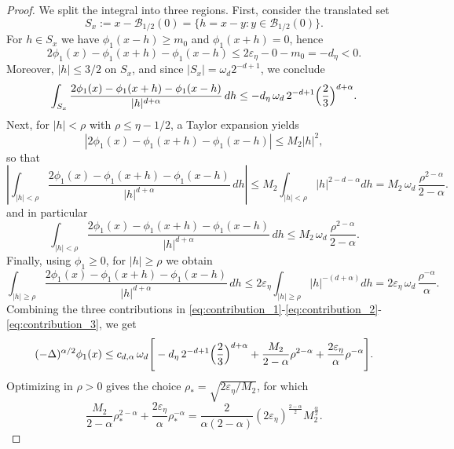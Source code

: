 \documentclass[10pt,a4paper]{amsart}
\newcommand{\abs}[1]{\left|#1\right|}
\begin{document}
\begin{proof}
	We split the integral into three regions. First, consider the translated set 
	\[ 
	S_x := x - \mathcal{B}_{1/2}(0) = \{ h = x-y : y\in \mathcal{B}_{1/2}(0)\}.
	\]   For $h\in S_x$ we have $\phi_1(x-h)\ge m_0$ and $\phi_1(x+h)=0$, hence
	\[
	2\phi_1(x)-\phi_1(x+h)-\phi_1(x-h) \le 2 \varepsilon_\eta-0-m_0 = -d_\eta<0.
	\]
	Moreover, $|h|\le 3/2$ on $S_x$, and since $\abs{S_x}=\omega_d 2^{-d+1}$, we conclude
	\begin{equation}\label{eq:contribution_1}
		\int_{S_x}\frac{2\phi_1(x)-\phi_1(x+h)-\phi_1(x-h)}{|h|^{d+\alpha}}\,dh
		\le - d_\eta\,\omega_d\,2^{-d+1}\Bigl(\frac{2}{3}\Bigr)^{d+\alpha}.
	\end{equation}
	Next, for $|h|<\rho$ with $\rho\le \eta-1/2$, a Taylor expansion yields
	\[
	|2\phi_1(x)-\phi_1(x+h)-\phi_1(x-h)| \le M_2 |h|^2,
	\]
	so that
	\begin{equation*}
		\left| \int_{|h|<\rho}\frac{2\phi_1(x)-\phi_1(x+h)-\phi_1(x-h)}{|h|^{d+\alpha}}\,dh\right| \leq M_2 \int_{|h|<\rho} \vert h \vert^{2-d-\alpha} dh  
		= M_2\,\omega_d\,\frac{\rho^{2-\alpha}}{2-\alpha}.
	\end{equation*}
	and in particular 
	\begin{equation}\label{eq:contribution_2}
		\int_{|h|<\rho}\frac{2\phi_1(x)-\phi_1(x+h)-\phi_1(x-h)}{|h|^{d+\alpha}}\,dh
		\le M_2\,\omega_d\,\frac{\rho^{2-\alpha}}{2-\alpha}.
	\end{equation}
	Finally, using $\phi_1\ge 0$, for $|h|\ge \rho$ we obtain
	\begin{equation}\label{eq:contribution_3}
		\int_{|h|\ge \rho}\frac{2\phi_1(x)-\phi_1(x+h)-\phi_1(x-h)}{|h|^{d+\alpha}}\,dh
		\le 2\varepsilon_\eta \int_{\abs{h}\geq \rho} \abs{h}^{-(d+\alpha)} dh = 2\varepsilon_\eta\,\omega_d\,\frac{\rho^{-\alpha}}{\alpha} .
	\end{equation}
	Combining the three contributions in \eqref{eq:contribution_1}-\eqref{eq:contribution_2}-\eqref{eq:contribution_3}, we get
	\begin{equation*}
		(-\Delta)^{\alpha/2}\phi_1(x)
		\le c_{d,\alpha}\,\omega_d\Bigg[
		- d_\eta\,2^{-d+1}\Bigl(\frac{2}{3}\Bigr)^{d+\alpha}
		+ \frac{M_2}{2-\alpha}\rho^{2-\alpha}
		+ \frac{2\varepsilon_\eta}{\alpha}\rho^{-\alpha}
		\Bigg].
	\end{equation*}
	Optimizing in $\rho>0$ gives the choice $\rho_*=\sqrt{2\varepsilon_\eta/M_2}$, for which
	\[
	\frac{M_2}{2-\alpha}\rho_*^{2-\alpha}
	+ \frac{2\varepsilon_\eta}{\alpha}\rho_*^{-\alpha}
	= \frac{2}{\alpha(2-\alpha)}(2\varepsilon_\eta)^{\frac{2-\alpha}{2}} M_2^{\frac{\alpha}{2}}.
\]
\end{proof}
\end{document}
